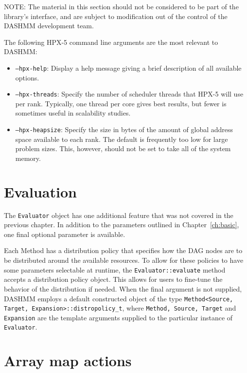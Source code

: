 NOTE: The material in this section should not be considered to be part of the
library's interface, and are subject to modification out of the control of
the DASHMM development team.

The following HPX-5 command line arguments are the most relevant to DASHMM:

\begin{itemize}
  \item \texttt{--hpx-help}: Display a help message giving a brief description
    of all available options.
  \item \texttt{--hpx-threads}: Specify the number of scheduler threads that
    HPX-5 will use per rank. Typically, one thread per core gives best results,
    but fewer is sometimes useful in scalability studies.
  \item \texttt{--hpx-heapsize}: Specify the size in bytes of the amount of
    global address space available to each rank. The default is frequently too
    low for large problem sizes. This, however, should not be set to take all
    of the system memory.
\end{itemize}



\section{Evaluation}

The \texttt{Evaluator} object has one additional feature that was not
covered in the previous chapter. In addition to the parameters outlined
in Chapter~\ref{ch:basic}, one final optional parameter is available.

Each Method has a distribution policy that specifies how the DAG nodes are
to be distributed around the available resources. To allow for these policies
to have some parameters selectable at runtime, the
\texttt{Evaluator::evaluate} method accepts a distribution policy object.
This allows for users to fine-tune the behavior of the distribution if needed.
When the final argument is not supplied, DASHMM employs a default constructed
object of the type \texttt{Method<Source, Target, Expansion>::distropolicy\_t},
where \texttt{Method, Source, Target} and \texttt{Expansion} are the template
arguments supplied to the particular instance of \texttt{Evaluator}.



\section{Array map actions}

